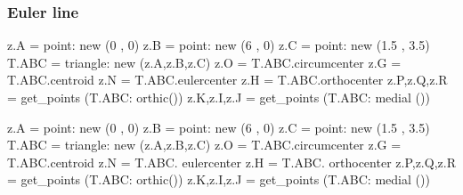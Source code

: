 \subsubsection{Euler line} %
\label{ssub:euler_line}

\begin{minipage}{.5\textwidth}
\begin{tkzexample}[latex=0cm,small,code only]
\begin{tkzelements}
   z.A           = point: new (0 , 0)
   z.B           = point: new (6 , 0)
   z.C           = point: new (1.5 , 3.5)
   T.ABC         = triangle: new (z.A,z.B,z.C)
   z.O           = T.ABC.circumcenter
   z.G           = T.ABC.centroid
   z.N           = T.ABC.eulercenter
   z.H           = T.ABC.orthocenter
   z.P,z.Q,z.R   = get_points (T.ABC: orthic())
   z.K,z.I,z.J   = get_points (T.ABC: medial ())
\end{tkzelements}
\end{tkzexample}
\end{minipage}
\begin{minipage}{.5\textwidth}
\begin{tkzelements}
 z.A    = point: new (0 , 0)
 z.B    = point: new (6 , 0)
 z.C    = point: new (1.5 , 3.5)
 T.ABC  = triangle: new (z.A,z.B,z.C)
 z.O    = T.ABC.circumcenter
 z.G    = T.ABC.centroid
 z.N    = T.ABC. eulercenter
 z.H    = T.ABC. orthocenter
 z.P,z.Q,z.R    = get_points (T.ABC: orthic())
 z.K,z.I,z.J    = get_points (T.ABC: medial ())
\end{tkzelements}
\hspace*{\fill}
\end{minipage}


